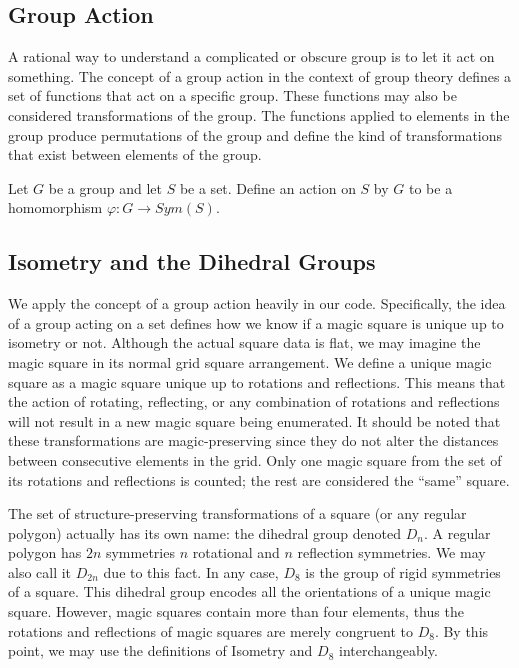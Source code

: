 \documentclass{rhumj_new}
\begin{document}
\subsection{Group Action}

A rational way to understand a complicated or obscure group is to let it act on something. The
concept of a group action in the context of group theory defines a set of functions that act on a
specific group. These functions may also be considered transformations of the group. The functions
applied to elements in the group produce permutations of the group and define the kind of
transformations that exist between elements of the group.

\begin{defin}\label{defaction}
  Let $G$ be a group and let $S$ be a set. Define an action on $S$ by $G$ to be a homomorphism
  $\varphi:G\rightarrow Sym\left(S\right)$.
\end{defin}

\subsection{Isometry and the Dihedral Groups}

We apply the concept of a group action heavily in our code. Specifically, the idea of a group
acting on a set defines how we know if a magic square is unique up to isometry or not. Although the
actual square data is flat, we may imagine the magic square in its normal grid square arrangement.
We define a unique magic square as a magic square unique up to rotations and reflections. This
means that the action of rotating, reflecting, or any combination of rotations and reflections will
not result in a new magic square being enumerated. It should be noted that these transformations
are magic-preserving since they do not alter the distances between consecutive elements in the
grid. Only one magic square from the set of its rotations and reflections is counted; the rest are
considered the ``same'' square.

The set of structure-preserving transformations of a square (or any regular polygon) actually
has its own name: the dihedral group denoted $D_n$. A regular polygon has $2n$ symmetries
\textemdash{}
$n$ rotational and $n$ reflection symmetries. We may also call it $D_{2n}$ due to this fact. In any
case, $D_8$ is the group of rigid symmetries of a square. This dihedral group encodes all the
orientations of a unique magic square. However, magic squares contain more than four elements, thus
the rotations and reflections of magic squares are merely congruent to $D_8$. By this point, we may
use the definitions of Isometry and $D_8$ interchangeably.
\end{document}

